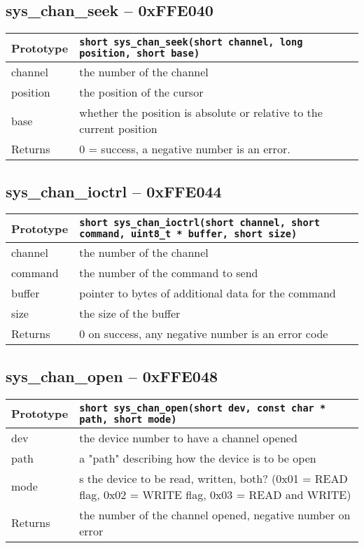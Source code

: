 \subsection*{sys\_chan\_seek -- 0xFFE040}
\begin{tabular}{|l||l|} \hline
Prototype & \lstinline!short sys_chan_seek(short channel, long position, short base)! \\ \hline
channel & the number of the channel \\ \hline
position & the position of the cursor \\ \hline
base & whether the position is absolute or relative to the current position \\ \hline
Returns & 0 = success, a negative number is an error. \\ \hline
\end{tabular}

\subsection*{sys\_chan\_ioctrl -- 0xFFE044}
\begin{tabular}{|l||l|} \hline
Prototype & \lstinline!short sys_chan_ioctrl(short channel, short command, uint8_t * buffer, short size)! \\ \hline
channel & the number of the channel \\ \hline
command & the number of the command to send \\ \hline
buffer & pointer to bytes of additional data for the command \\ \hline
size & the size of the buffer \\ \hline
Returns & 0 on success, any negative number is an error code \\ \hline
\end{tabular}

\subsection*{sys\_chan\_open -- 0xFFE048}
\begin{tabular}{|l||l|} \hline
Prototype & \lstinline!short sys_chan_open(short dev, const char * path, short mode)! \\ \hline
dev & the device number to have a channel opened \\ \hline
path & a "path" describing how the device is to be open \\ \hline
mode & s the device to be read, written, both? (0x01 = READ flag, 0x02 = WRITE flag, 0x03 = READ and WRITE) \\ \hline
Returns & the number of the channel opened, negative number on error \\ \hline
\end{tabular}

